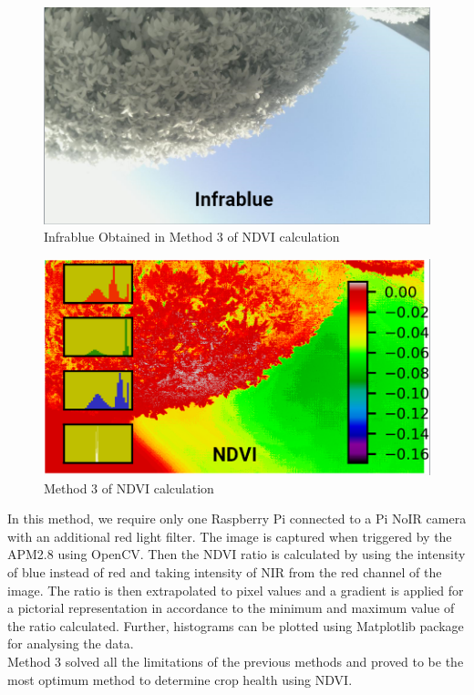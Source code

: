 \begin{figure}[H]
    \centering
    \includegraphics[width=0.7\linewidth]{SummerInterReport/project/Images-Major/infrablue.png}
    \caption{Infrablue Obtained in Method 3 of NDVI calculation}
    \label{fig:compEy}
\end{figure}
\begin{figure}[H]
    \centering
    \includegraphics[width=\linewidth]{SummerInterReport/project/Images-Major/ndvi_three.png}
    \caption{Method 3 of NDVI calculation}
    \label{fig:compEy}
\end{figure}

In this method, we require only one Raspberry Pi connected to a Pi NoIR camera with an additional red light filter. The image is captured when triggered by the APM2.8 using OpenCV. Then the NDVI ratio is calculated by using the intensity of blue instead of red and taking intensity of NIR from the red channel of the image. The ratio is then extrapolated to pixel values and a gradient is applied for a pictorial representation in accordance to the minimum and maximum value of the ratio calculated. Further, histograms can be plotted using Matplotlib package for analysing the data.
\\
Method 3 solved all the limitations of the previous methods and proved to be the most optimum method to determine crop health using NDVI.
